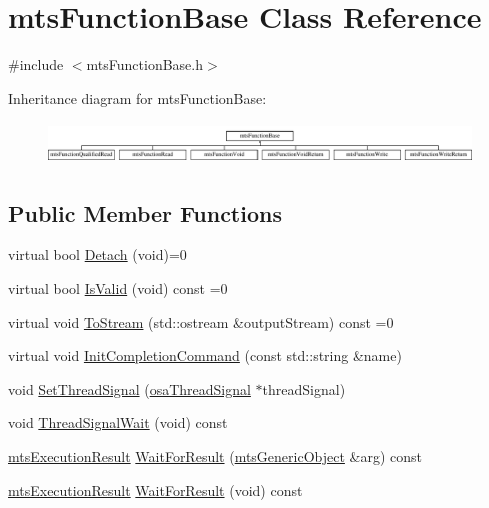 \hypertarget{classmts_function_base}{}\section{mts\+Function\+Base Class Reference}
\label{classmts_function_base}


{\ttfamily \#include $<$mts\+Function\+Base.\+h$>$}

Inheritance diagram for mts\+Function\+Base\+:\begin{figure}[H]
\begin{center}
\leavevmode
\includegraphics[height=1.117764cm]{d9/d3d/classmts_function_base}
\end{center}
\end{figure}
\subsection*{Public Member Functions}
\begin{DoxyCompactItemize}
\item 
virtual bool \hyperlink{classmts_function_base_a92dd688c12afb4771318b8ed29aa9c07}{Detach} (void)=0
\item 
virtual bool \hyperlink{classmts_function_base_ac0bea342090b03346b58232eb5f9f5d8}{Is\+Valid} (void) const =0
\item 
virtual void \hyperlink{classmts_function_base_ae6e5497be34d5563f2df3cb24d68e959}{To\+Stream} (std\+::ostream \&output\+Stream) const =0
\item 
virtual void \hyperlink{classmts_function_base_a77240cbe7459e0fea4b1eb4c7f9a53ad}{Init\+Completion\+Command} (const std\+::string \&name)
\item 
void \hyperlink{classmts_function_base_acf5a46f51a63801aa3da6c4fb4497f49}{Set\+Thread\+Signal} (\hyperlink{classosa_thread_signal}{osa\+Thread\+Signal} $\ast$thread\+Signal)
\item 
void \hyperlink{classmts_function_base_ab8e3e4767f9036a4950fba809530756a}{Thread\+Signal\+Wait} (void) const 
\item 
\hyperlink{classmts_execution_result}{mts\+Execution\+Result} \hyperlink{classmts_function_base_a37ccde77fd39ec754fb6bb57635c0fed}{Wait\+For\+Result} (\hyperlink{classmts_generic_object}{mts\+Generic\+Object} \&arg) const 
\item 
\hyperlink{classmts_execution_result}{mts\+Execution\+Result} \hyperlink{classmts_function_base_a27daf6336f69e18f79f292ac8b73376c}{Wait\+For\+Result} (void) const 
\end{DoxyCompactItemize}
